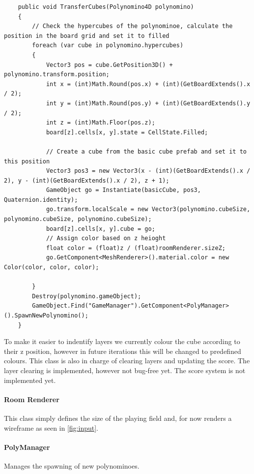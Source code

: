 \documentclass{article}
\begin{document}
\begin{verbatim}
    public void TransferCubes(Polynomino4D polynomino)
    {
        // Check the hypercubes of the polynominoe, calculate the position in the board grid and set it to filled
        foreach (var cube in polynomino.hypercubes)
        {
            Vector3 pos = cube.GetPosition3D() + polynomino.transform.position;
            int x = (int)Math.Round(pos.x) + (int)(GetBoardExtends().x / 2);
            int y = (int)Math.Round(pos.y) + (int)(GetBoardExtends().y / 2);
            int z = (int)Math.Floor(pos.z);
            board[z].cells[x, y].state = CellState.Filled;
 
            // Create a cube from the basic cube prefab and set it to this position
            Vector3 pos3 = new Vector3(x - (int)(GetBoardExtends().x / 2), y - (int)(GetBoardExtends().x / 2), z + 1);
            GameObject go = Instantiate(basicCube, pos3, Quaternion.identity);
            go.transform.localScale = new Vector3(polynomino.cubeSize, polynomino.cubeSize, polynomino.cubeSize);
            board[z].cells[x, y].cube = go;
            // Assign color based on z heioght
            float color = (float)z / (float)roomRenderer.sizeZ;
            go.GetComponent<MeshRenderer>().material.color = new Color(color, color, color);
 
        }
        Destroy(polynomino.gameObject);
        GameObject.Find("GameManager").GetComponent<PolyManager>().SpawnNewPolynomino();
    }
\end{verbatim}
To make it easier to indentify layers we currently colour the cube according to their z position, however in future iterations this will be changed to predefined colours.
This class is also in charge of clearing layers and updating the score. The layer clearing is implemented, however not bug-free yet. The score system is not implemented yet.

\paragraph{Room Renderer}
This class simply defines the size of the playing field and, for now renders a wireframe as seen in \ref{fig:input}.

\paragraph{PolyManager}
Manages the spawning of new polynominoes. 
\end{document}
